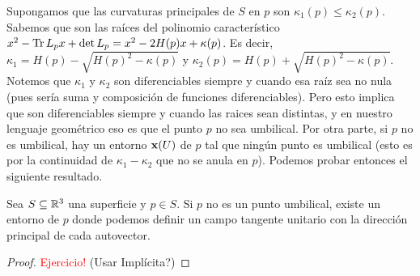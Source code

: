 Supongamos que las curvaturas principales de $S$ en $p$ son $\kappa_1(p)\leq \kappa_2(p)$. Sabemos que son las raíces del polinomio característico $x^2 - \operatorname{Tr} L_p x + \det L_p = x^2 - 2H(p)x + \kappa(p)$. Es decir, $\kappa_1 = H(p)-\sqrt{H(p)^2 - \kappa(p)}$ y $\kappa_2(p)=H(p)+\sqrt{H(p)^2 - \kappa(p)}$. Notemos que $\kappa_1$ y $\kappa_2$ son diferenciables siempre y cuando esa raíz sea no nula (pues sería suma y composición de funciones diferenciables). Pero esto implica que son diferenciables siempre y cuando las raices sean distintas, y en nuestro lenguaje geométrico eso es que el punto $p$ no sea umbilical. Por otra parte, si $p$ no es umbilical, hay un entorno $\operatorname{\mathbf{x}}(U)$ de $p$ tal que ningún punto es umbilical (esto es por la continuidad de $\kappa_1-\kappa_2$ que no se anula en $p$). Podemos probar entonces el siguiente resultado.
\begin{prop}
Sea $S\subseteq\mathbb{R}^3$ una superficie y $p\in S$. Si $p$ no es un punto umbilical, existe un entorno de $p$ donde podemos definir un campo tangente unitario con la dirección principal de cada autovector.
\begin{proof}
\textcolor{red}{Ejercicio!} (Usar Implícita?)
\end{proof}
\end{prop}

